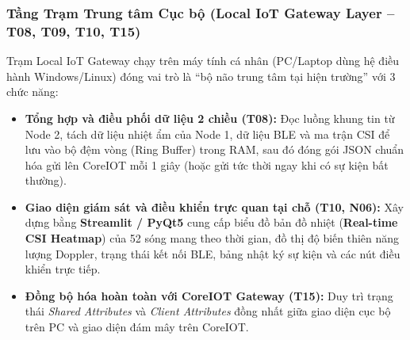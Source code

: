 \documentclass{hcmut-report}
\begin{document}
\subsubsection[Tầng Trạm Trung tâm Cục bộ (T08, T09, T10, T15)]{Tầng Trạm Trung tâm Cục bộ (Local IoT Gateway Layer -- T08, T09, T10, T15)}
Trạm Local IoT Gateway chạy trên máy tính cá nhân (PC/Laptop dùng hệ điều hành Windows/Linux) đóng vai trò là ``bộ não trung tâm tại hiện trường'' với 3 chức năng:
\begin{itemize}
  \item \textbf{Tổng hợp và điều phối dữ liệu 2 chiều (\textbf{T08}):} Đọc luồng khung tin từ Node 2, tách dữ liệu nhiệt ẩm của Node 1, dữ liệu BLE và ma trận CSI để lưu vào bộ đệm vòng (Ring Buffer) trong RAM, sau đó đóng gói JSON chuẩn hóa gửi lên CoreIOT mỗi 1 giây (hoặc gửi tức thời ngay khi có sự kiện bất thường).
  \item \textbf{Giao diện giám sát và điều khiển trực quan tại chỗ (\textbf{T10, N06}):} Xây dựng bằng \textbf{Streamlit / PyQt5} cung cấp biểu đồ bản đồ nhiệt (\textbf{Real-time CSI Heatmap}) của 52 sóng mang theo thời gian, đồ thị độ biến thiên năng lượng Doppler, trạng thái kết nối BLE, bảng nhật ký sự kiện và các nút điều khiển trực tiếp.
  \item \textbf{Đồng bộ hóa hoàn toàn với CoreIOT Gateway (\textbf{T15}):} Duy trì trạng thái \textit{Shared Attributes} và \textit{Client Attributes} đồng nhất giữa giao diện cục bộ trên PC và giao diện đám mây trên CoreIOT.
\end{itemize}
\end{document}
